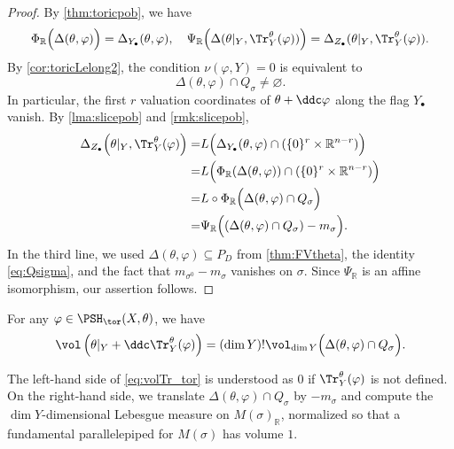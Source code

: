 \begin{proof}
    By \cref{thm:toricpob}, we have
    \[
    \Phi_{\mathbb{R}} \Bigl( \Delta(\theta,\varphi) \Bigr)= \Delta_{Y_{\bullet}}(\theta,\varphi),\quad \Psi_{\mathbb{R}} \Bigl( \Delta(\theta|_Y,\Tr_{Y}^{\theta}(\varphi)) \Bigr)= \Delta_{Z_{\bullet}}(\theta|_Y,\Tr_{Y}^{\theta}(\varphi)).
    \]
    By \cref{cor:toricLelong2}, the condition $\nu(\varphi,Y)=0$ is equivalent to
    \[
        \Delta(\theta,\varphi)\cap Q_\sigma\neq\varnothing.
    \]
    In particular, the first $r$ valuation coordinates of $\theta+\ddc\varphi$ along the flag $Y_\bullet$ vanish.
    By \cref{lma:slicepob} and \cref{rmk:slicepob},
    \[
    \begin{aligned}
    \Delta_{Z_{\bullet}}\Bigl(\theta|_Y,\Tr_{Y}^{\theta}(\varphi)\Bigr)=& L \Bigl(  \Delta_{Y_{\bullet}}(\theta,\varphi) \cap (\{0\}^r \times \mathbb{R}^{n-r})\Bigr)\\
    =& L\Bigl( \Phi_{\mathbb{R}}(\Delta(\theta,\varphi)) \cap (\{0\}^r \times \mathbb{R}^{n-r}) \Bigr)\\
    =& L\circ \Phi_{\mathbb{R}} \Bigl(\Delta(\theta,\varphi)\cap Q_{\sigma} \Bigr)\\
    =& \Psi_{\mathbb{R}}\Bigl((\Delta(\theta,\varphi)\cap Q_{\sigma})-m_{\sigma}\Bigr).
    \end{aligned}
    \]
    In the third line, we used $\Delta(\theta,\varphi)\subseteq P_D$ from \cref{thm:FVtheta}, the identity \eqref{eq:Qsigma}, and the fact that $m_{\sigma^0}-m_\sigma$ vanishes on $\sigma$.
    Since $\Psi_{\mathbb{R}}$ is an affine isomorphism, our assertion follows.
\end{proof}

\begin{corollary}\label{cor:tor_tr_vol}
    For any $\varphi\in \PSH_{\tor}(X,\theta)$, we have
    \begin{equation}\label{eq:volTr_tor}
    \vol \left(\theta|_Y+\ddc \Tr_Y^{\theta}(\varphi)\right)=(\dim Y)!\vol_{\dim Y} \Bigl(\Delta(\theta,\varphi)\cap Q_{\sigma}\Bigr).
    \end{equation}
\end{corollary}
The left-hand side of \eqref{eq:volTr_tor} is understood as $0$ if $\Tr_Y^{\theta}(\varphi)$ is not defined. On the right-hand side, we translate $\Delta(\theta,\varphi)\cap Q_{\sigma}$ by $-m_{\sigma}$ and compute the $\dim Y$-dimensional Lebesgue measure on $M(\sigma)_{\mathbb{R}}$, normalized so that a fundamental parallelepiped for $M(\sigma)$ has volume $1$.


